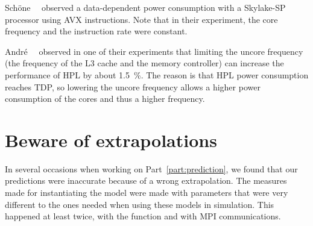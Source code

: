             Sch{\"{o}}ne~\etal~\cite{DBLP:journals/corr/abs-1905-12468} observed a data-dependent power consumption with
            a Skylake-SP processor using AVX instructions. Note that in their experiment, the core frequency and the
            instruction rate were constant.

            Andr\'e~\etal~\cite{andre:hal-02401796} observed in one of their experiments that limiting the uncore
            frequency (\ie the frequency of the L3 cache and the memory controller) can increase the performance of HPL
            by about \SI{1.5}{\percent}. The reason is that HPL power consumption reaches TDP, so lowering the uncore
            frequency allows a higher power consumption of the cores and thus a higher frequency.

    \section{Beware of extrapolations}%
    \label{sec:beware_of_extrapolations}
        In several occasions when working on Part~\ref{part:prediction}, we found that our predictions were inaccurate
        because of a wrong extrapolation. The measures made for instantiating the model were made with parameters that
        were very different to the ones needed when using these models in simulation. This happened at least twice, with
        the \dgemm function and with MPI communications.

